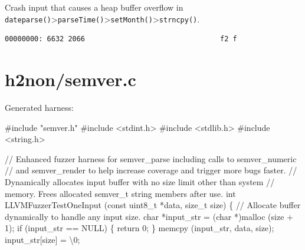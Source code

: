 \documentclass[
  a4paper,
]{scrreprt}
\newenvironment{Shaded}{\begin{snugshade}}{\end{snugshade}}
\newcommand{\CharTok}[1]{\textcolor[rgb]{0.00,0.50,0.00}{#1}}
\newcommand{\CommentTok}[1]{\textcolor[rgb]{0.41,0.41,0.41}{#1}}
\newcommand{\ControlFlowTok}[1]{\textcolor[rgb]{0.85,0.12,0.09}{#1}}
\newcommand{\DataTypeTok}[1]{\textcolor[rgb]{0.47,0.16,0.63}{#1}}
\newcommand{\DecValTok}[1]{\textcolor[rgb]{0.47,0.16,0.63}{#1}}
\newcommand{\ImportTok}[1]{\textcolor[rgb]{0.33,0.33,0.33}{#1}}
\newcommand{\NormalTok}[1]{\textcolor[rgb]{0.33,0.33,0.33}{#1}}
\newcommand{\OperatorTok}[1]{\textcolor[rgb]{0.00,0.46,0.62}{#1}}
\newcommand{\PreprocessorTok}[1]{\textcolor[rgb]{0.47,0.16,0.63}{#1}}
\newcommand{\SpecialCharTok}[1]{\textcolor[rgb]{0.00,0.46,0.62}{#1}}
\theoremstyle{definition}
\theoremstyle{remark}
\begin{document}
Crash input that causes a heap buffer overflow in
\texttt{dateparse()}\textgreater{}\texttt{parseTime()}\textgreater{}\texttt{setMonth()}\textgreater{}\texttt{strncpy()}.

\begin{verbatim}
00000000: 6632 2066                                f2 f
\end{verbatim}

\section{h2non/semver.c}\label{h2nonsemver.c}

Generated harness:

\begin{Shaded}
\begin{Highlighting}[numbers=left,,]
\PreprocessorTok{\#include }\ImportTok{"semver.h"}
\PreprocessorTok{\#include }\ImportTok{\textless{}stdint.h\textgreater{}}
\PreprocessorTok{\#include }\ImportTok{\textless{}stdlib.h\textgreater{}}
\PreprocessorTok{\#include }\ImportTok{\textless{}string.h\textgreater{}}

\CommentTok{// Enhanced fuzzer harness for semver\_parse including calls to semver\_numeric}
\CommentTok{// and semver\_render to help increase coverage and trigger more bugs faster.}
\CommentTok{// Dynamically allocates input buffer with no size limit other than system}
\CommentTok{// memory. Frees allocated semver\_t string members after use.}
\DataTypeTok{int}
\NormalTok{LLVMFuzzerTestOneInput }\OperatorTok{(}\DataTypeTok{const} \DataTypeTok{uint8\_t} \OperatorTok{*}\NormalTok{data}\OperatorTok{,} \DataTypeTok{size\_t}\NormalTok{ size}\OperatorTok{)}
\OperatorTok{\{}
  \CommentTok{// Allocate buffer dynamically to handle any input size.}
  \DataTypeTok{char} \OperatorTok{*}\NormalTok{input\_str }\OperatorTok{=} \OperatorTok{(}\DataTypeTok{char} \OperatorTok{*)}\NormalTok{malloc }\OperatorTok{(}\NormalTok{size }\OperatorTok{+} \DecValTok{1}\OperatorTok{);}
  \ControlFlowTok{if} \OperatorTok{(}\NormalTok{input\_str }\OperatorTok{==}\NormalTok{ NULL}\OperatorTok{)}
    \OperatorTok{\{}
      \ControlFlowTok{return} \DecValTok{0}\OperatorTok{;}
    \OperatorTok{\}}
\NormalTok{  memcpy }\OperatorTok{(}\NormalTok{input\_str}\OperatorTok{,}\NormalTok{ data}\OperatorTok{,}\NormalTok{ size}\OperatorTok{);}
\NormalTok{  input\_str}\OperatorTok{[}\NormalTok{size}\OperatorTok{]} \OperatorTok{=} \CharTok{\textquotesingle{}}\SpecialCharTok{\textbackslash{}0}\CharTok{\textquotesingle{}}\OperatorTok{;}


\end{Highlighting}
\end{Shaded}
\end{document}

